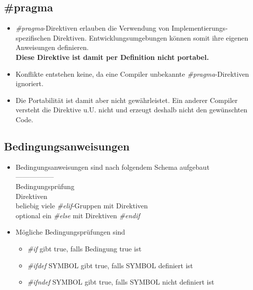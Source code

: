 \subsection{\#pragma}
\begin{itemize}
	\item \emph{\#pragma}-Direktiven erlauben die Verwendung von Implementierungs-spezifischen Direktiven. Entwicklungsumgebungen können somit ihre eigenen Anweisungen definieren.\\
	\textbf{Diese Direktive ist damit per Definition nicht portabel.}
	\item Konflikte entstehen keine, da eine Compiler unbekannte \emph{\#pragma}-Direktiven ignoriert.
	\item Die Portabilität ist damit aber nicht gewährleistet. Ein anderer Compiler versteht die Direktive u.U. nicht und erzeugt deshalb nicht den gewünschten Code.
\end{itemize}

\subsection{Bedingungsanweisungen}
\begin{itemize}
	\item Bedingungsanweisungen sind nach folgendem Schema aufgebaut\\
	-----------------\\
	Bedingungsprüfung\\
	Direktiven\\
	beliebig viele \emph{\#elif}-Gruppen mit Direktiven\\
	optional ein \emph{\#else} mit Direktiven
	\emph{\#endif}
	\item Mögliche Bedingungsprüfungen sind
	\begin{itemize}
		\item \emph{\#if} gibt true, falls Bedingung true ist
		\item \emph{\#ifdef} SYMBOL gibt true, falls SYMBOL definiert ist
		\item \emph{\#ifndef} SYMBOL gibt true, falls SYMBOL nicht definiert ist
	\end{itemize}
\end{itemize}
\vfill
\pagebreak\newpage

